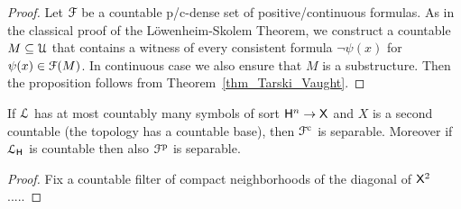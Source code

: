 \documentclass{amsproc}
\newcommand{\mylabel}[1]{{#1}\hfill}
\renewenvironment{itemize}
  {\begin{list}{$\triangleright$}{%
  \setlength{\parskip}{0mm}
  \setlength{\topsep}{.4\baselineskip}
  \setlength{\rightmargin}{0mm}
  \setlength{\listparindent}{0mm}
  \setlength{\itemindent}{0mm}
  \setlength{\labelwidth}{3ex}
  \setlength{\itemsep}{.2\baselineskip}
  \setlength{\parsep}{.2\baselineskip}
  \setlength{\partopsep}{0mm}
  \setlength{\labelsep}{1ex}
  \setlength{\leftmargin}{\labelwidth+\labelsep}
  \let\makelabel\mylabel}}{%
\end{list}}
\renewcommand*{\emph}[1]{%
   \smash{\tikz[baseline]\node[rectangle, fill=teal!25, rounded corners, inner xsep=0.5ex, inner ysep=0.2ex, anchor=base, minimum height = 2.7ex]{\strut #1};}}
\begin{document}
{\begin{proof}
  Let ${\EuScript F}$ be a countable p/c-dense set of positive/continuous formulas.
  As in the classical proof of the L\"owenheim-Skolem Theorem, we construct a countable $M\subseteq{\EuScript U}$ that contains a witness of every consistent formula $\neg\psi(x)$ for $\psi(x)\in{\EuScript F}(M)$.
  In continuous case we also ensure that $M$ is a substructure.
  Then the proposition follows from Theorem~\ref{thm_Tarski_Vaught}.
\end{proof}

\begin{proposition}
  If ${\EuScript L}$ has at most countably many symbols of sort ${\sf H}^n\to {\sf X}$ and $X$ is a second countable (the topology has a countable base), then ${\EuScript F}^{\rm c}$ is separable.
  Moreover if ${\EuScript L}_{\sf H}$ is countable then also ${\EuScript F}^{\rm p}$ is separable.
\end{proposition}

\begin{proof}
  Fix a countable filter of compact neighborhoods of the diagonal of ${\sf X}^2$.....  
\end{proof}











}
\end{document}
